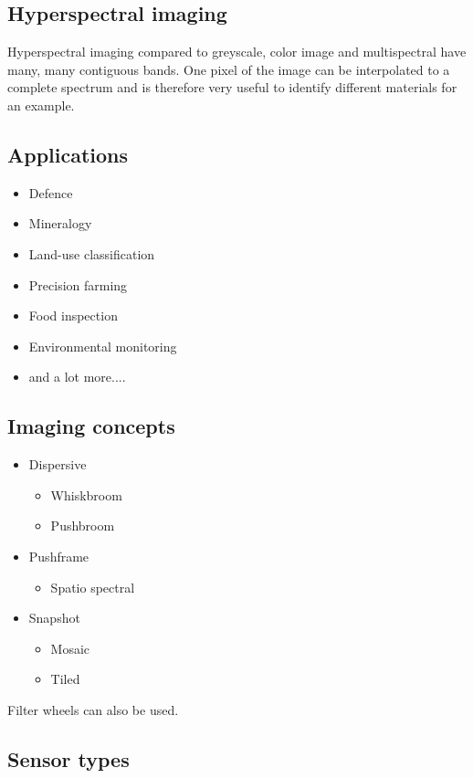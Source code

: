 	\subsection*{Hyperspectral imaging}
	Hyperspectral imaging compared to greyscale, color image and multispectral have many, many contiguous bands. One pixel of the image can be interpolated to a complete spectrum and is therefore very useful to identify different materials for an example. 

	\subsection*{Applications}
	\begin{itemize}
		\item Defence
		\item Mineralogy
		\item Land-use classification 
		\item Precision farming
		\item Food inspection
		\item Environmental monitoring
		\item  and a lot more....
	\end{itemize}

	\subsection*{Imaging concepts}

	\begin{itemize}
		\item Dispersive
		\begin{itemize}
			\item Whiskbroom
			\item Pushbroom
		\end{itemize}
		\item Pushframe
		\begin{itemize}
			\item Spatio spectral
		\end{itemize}
		\item Snapshot
		\begin{itemize}
				\item Mosaic
				\item Tiled
			\end{itemize}	
	\end{itemize}

	Filter wheels can also be used.

	\subsection*{Sensor types}
	
